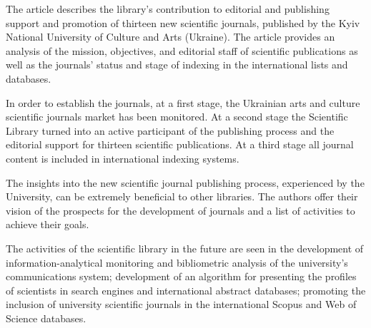 The article describes the library's contribution to editorial and
publishing support and promotion of thirteen new scientific journals,
published by the Kyiv National University of Culture and Arts (Ukraine).
The article provides an analysis of the mission, objectives, and
editorial staff of scientific publications as well as the journals'
status and stage of indexing in the international lists and databases.

In order to establish the journals, at a first stage, the Ukrainian arts
and culture scientific journals market has been monitored. At a second
stage the Scientific Library turned into an active participant of the
publishing process and the editorial support for thirteen scientific
publications. At a third stage all journal content is included in
international indexing systems.

The insights into the new scientific journal publishing process,
experienced by the University, can be extremely beneficial to other
libraries. The authors offer their vision of the prospects for the
development of journals and a list of activities to achieve their goals.

The activities of the scientific library in the future are seen in the
development of information-analytical monitoring and bibliometric
analysis of the university's communications system; development of an
algorithm for presenting the profiles of scientists in search engines
and international abstract databases; promoting the inclusion of
university scientific journals in the international Scopus and Web of
Science databases.
